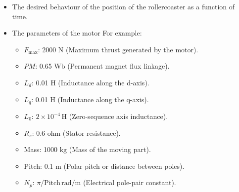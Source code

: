 \documentclass{article}
\begin{document}
    \begin{itemize}
        \item The desired behaviour of the position of the rollercoaster as a function
            of time.

        \item The parameters of the motor For example:
            \begin{itemize}
                \item $F_{\text{max}}$: 2000 N (Maximum thrust generated by the motor).

                \item $PM$: 0.65 Wb (Permanent magnet flux linkage).

                \item $L_{d}$: 0.01 H (Inductance along the d-axis).

                \item $L_{q}$: 0.01 H (Inductance along the q-axis).

                \item $L_{0}$: $2 \times 10^{-4}\, \text{H}$ (Zero-sequence axis
                    inductance).

                \item $R_{s}$: 0.6 ohm (Stator resistance).

                \item Mass: 1000 kg (Mass of the moving part).

                \item Pitch: 0.1 m (Polar pitch or distance between poles).

                \item $N_{p}$: $\pi/\text{Pitch}\, \text{rad/m}$ (Electrical pole-pair
                    constant).
            \end{itemize}
    \end{itemize}
\end{document}
